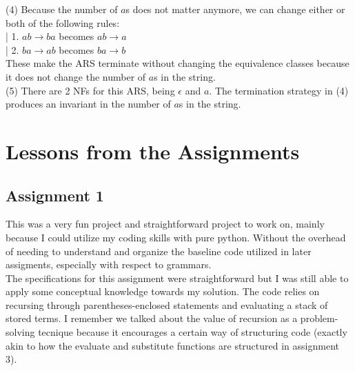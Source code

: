 \documentclass{article}
\theoremstyle{theorem}
\theoremstyle{definition}
\theoremstyle{remark}
\begin{document}
  (4) Because the number of $a$s does not matter anymore, we can change either or both of the following rules:\\
    |    1. $ab \rightarrow ba$ becomes $ab \rightarrow a$\\
    |    2. $ba \rightarrow ab$ becomes $ba \rightarrow b$\\
    These make the ARS terminate without changing the equivalence classes because it does not change the number of $a$s in the string.\\

  (5) There are 2 NFs for this ARS, being $\epsilon$ and $a$. The termination strategy in (4) produces an invariant in the number of $a$s in the string.\\

\section{Lessons from the Assignments}

\subsection{Assignment 1}
This was a very fun project and straightforward project to work on, mainly because I could utilize my coding skills with pure python. Without the overhead of needing to understand and organize the baseline code utilized in later assigments, especially with respect to grammars.\\

The specifications for this assignment were straightforward but I was still able to apply some conceptual knowledge towards my solution. The code relies on recursing through parentheses-enclosed statements and evaluating a stack of stored terms. I remember we talked about the value of recursion as a problem-solving tecnique because it encourages a certain way of structuring code (exactly akin to how the evaluate and substitute functions are structured in assignment 3).\\
\end{document}
